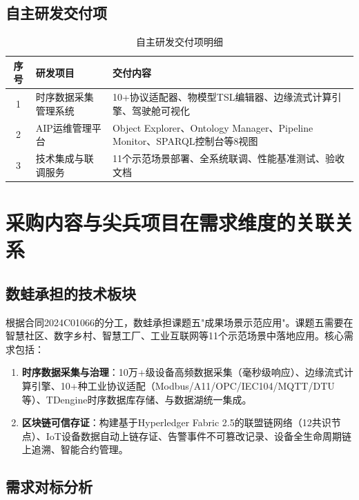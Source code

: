 \documentclass[12pt,a4paper]{ctexart}
\begin{document}
\subsection{自主研发交付项}

\begin{table}[H]
\centering
\caption{自主研发交付项明细}
\begin{tabular}{@{}cll@{}}
\toprule
\textbf{序号} & \textbf{研发项目} & \textbf{交付内容} \\
\midrule
1 & 时序数据采集管理系统 & 10+协议适配器、物模型TSL编辑器、边缘流式计算引擎、驾驶舱可视化 \\
2 & AIP运维管理平台 & Object Explorer、Ontology Manager、Pipeline Monitor、SPARQL控制台等8视图 \\
3 & 技术集成与联调服务 & 11个示范场景部署、全系统联调、性能基准测试、验收文档 \\
\bottomrule
\end{tabular}
\end{table}

\section{采购内容与尖兵项目在需求维度的关联关系}

\subsection{数蛙承担的技术板块}

根据合同2024C01066的分工，数蛙承担课题五"成果场景示范应用"。课题五需要在智慧社区、数字乡村、智慧工厂、工业互联网等11个示范场景中落地应用。核心需求包括：

\begin{enumerate}[leftmargin=*]
  \item \textbf{时序数据采集与治理}：10万+级设备高频数据采集（毫秒级响应）、边缘流式计算引擎、10+种工业协议适配（Modbus/A11/OPC/IEC104/MQTT/DTU等）、TDengine时序数据库存储、与数据湖统一集成。
  \item \textbf{区块链可信存证}：构建基于Hyper\-ledger Fabric 2.5的联盟链网络（12共识节点）、IoT设备数据自动上链存证、告警事件不可篡改记录、设备全生命周期链上追溯、智能合约管理。
\end{enumerate}

\subsection{需求对标分析}
\end{document}
